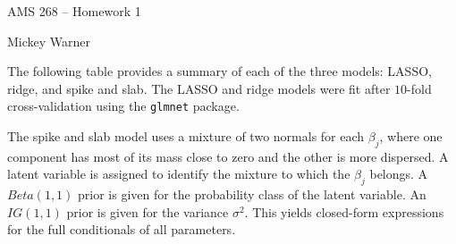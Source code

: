 \documentclass[12pt]{article}
\begin{document}
AMS 268 -- Homework 1

Mickey Warner
\bigskip
\bigskip


The following table provides a summary of each of the three models: LASSO, ridge, and spike and slab. The LASSO and ridge models were fit after $10$-fold cross-validation using the \texttt{glmnet} package.
\bigskip

The spike and slab model uses a mixture of two normals for each $\beta_j$, where one component has most of its mass close to zero and the other is more dispersed. A latent variable is assigned to identify the mixture to which the $\beta_j$ belongs. A $Beta(1,1)$ prior is given for the probability class of the latent variable. An $IG(1,1)$ prior is given for the variance $\sigma^2$. This yields closed-form expressions for the full conditionals of all parameters.
\end{document}

